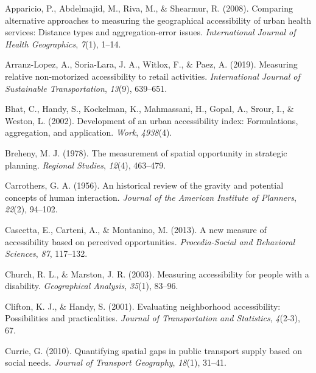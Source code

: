 \documentclass[
11pt, %
oneside, %
english, %
singlespacing, %
]{macthesis} %
\newlength{\cslhangindent}
\newenvironment{CSLReferences}[2] %
 {%
  \setlength{\parindent}{0pt}
  \ifodd #1 \everypar{\setlength{\hangindent}{\cslhangindent}}\ignorespaces\fi
  \ifnum #2 > 0
  \setlength{\parskip}{#2\baselineskip}
  \fi
 }%
 {}
\begin{document}
\hypertarget{refs}{}
\begin{CSLReferences}{1}{0}
\leavevmode{}%
Apparicio, P., Abdelmajid, M., Riva, M., \& Shearmur, R. (2008). Comparing alternative approaches to measuring the geographical accessibility of urban health services: Distance types and aggregation-error issues. \emph{International Journal of Health Geographics}, \emph{7}(1), 1--14.

\leavevmode{}%
Arranz-Lopez, A., Soria-Lara, J. A., Witlox, F., \& Paez, A. (2019). Measuring relative non-motorized accessibility to retail activities. \emph{International Journal of Sustainable Transportation}, \emph{13}(9), 639--651.

\leavevmode{}%
Bhat, C., Handy, S., Kockelman, K., Mahmassani, H., Gopal, A., Srour, I., \& Weston, L. (2002). Development of an urban accessibility index: Formulations, aggregation, and application. \emph{Work}, \emph{4938}(4).

\leavevmode{}%
Breheny, M. J. (1978). The measurement of spatial opportunity in strategic planning. \emph{Regional Studies}, \emph{12}(4), 463--479.

\leavevmode{}%
Carrothers, G. A. (1956). An historical review of the gravity and potential concepts of human interaction. \emph{Journal of the American Institute of Planners}, \emph{22}(2), 94--102.

\leavevmode{}%
Cascetta, E., Carteni, A., \& Montanino, M. (2013). A new measure of accessibility based on perceived opportunities. \emph{Procedia-Social and Behavioral Sciences}, \emph{87}, 117--132.

\leavevmode{}%
Church, R. L., \& Marston, J. R. (2003). Measuring accessibility for people with a disability. \emph{Geographical Analysis}, \emph{35}(1), 83--96.

\leavevmode{}%
Clifton, K. J., \& Handy, S. (2001). Evaluating neighborhood accessibility: Possibilities and practicalities. \emph{Journal of Transportation and Statistics}, \emph{4}(2-3), 67.

\leavevmode{}%
Currie, G. (2010). Quantifying spatial gaps in public transport supply based on social needs. \emph{Journal of Transport Geography}, \emph{18}(1), 31--41.


\end{CSLReferences}
\end{document}

